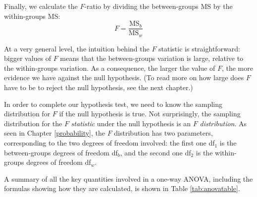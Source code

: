 \documentclass[
]{book}
\theoremstyle{definition}
\theoremstyle{definition}
\theoremstyle{definition}
\theoremstyle{definition}
\theoremstyle{remark}
\begin{document}
Finally, we calculate the \(F\)-ratio by dividing the between-groups MS by the within-groups MS:
\[
F = \frac{\mbox{MS}_b }{ \mbox{MS}_w } 
\]

At a very general level, the intuition behind the \(F\) statistic is straightforward: bigger values of \(F\) means that the between-groups variation is large, relative to the within-groups variation. As a consequence, the larger the value of \(F\), the more evidence we have against the null hypothesis. (To read more on how large does \(F\) have to be to reject the null hypothesis, see the next chapter.)

In order to complete our hypothesis test, we need to know the sampling distribution for \(F\) if the null hypothesis is true. Not surprisingly, the sampling distribution for the \(F\) \emph{statistic} under the null hypothesis is an \(F\) \emph{distribution}. As seen in Chapter \ref{probability}, the \(F\) distribution has two parameters, corresponding to the two degrees of freedom involved: the first one df\(_1\) is the between-groups degrees of freedom df\(_b\), and the second one df\(_2\) is the within-groups degrees of freedom df\(_w\).

A summary of all the key quantities involved in a one-way ANOVA, including the formulas showing how they are calculated, is shown in Table \ref{tab:anovatable}.
\end{document}
